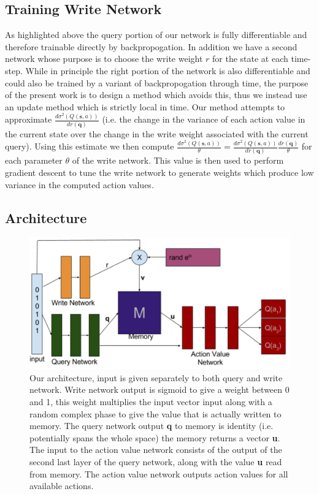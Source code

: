 \documentclass{article}
\begin{document}
\subsection*{Training Write Network}
As highlighted above the query portion of our network is fully differentiable and therefore trainable directly by backpropogation. In addition we have a second network whose purpose is to choose the write weight $r$ for the state at each time-step. While in principle the right portion of the network is also differentiable and could also be trained by a variant of backpropogation through time, the purpose of the present work is to design a method which avoids this, thus we instead use an update method which is strictly local in time. Our method attempts to approximate $\frac{d\sigma^2(Q(\pmb{s},a))}{dr(\pmb{q})}$ (i.e. the change in the variance of each action value in the current state over the change in the write weight associated with the current query). Using this estimate we then compute $\frac{d\sigma^2(Q(\pmb{s},a))}{\theta}=\frac{d\sigma^2(Q(\pmb{s},a))}{dr(\pmb{q})}\frac{dr(\pmb{q})}{\theta}$ for each parameter $\theta$ of the write network. This value is then used to perform gradient descent to tune the write network to generate weights which produce low variance in the computed action values.
\subsection*{Architecture}
\begin{figure}[!ht]
\includegraphics[width=1\textwidth]{images/architecture.png}
\caption{Our architecture, input is given separately to both query and write network. Write network output is sigmoid to give a weight between 0 and 1, this weight multiplies the input vector input along with a random complex phase to give the value that is actually written to memory. The query network output \textbf{q} to memory is identity (i.e. potentially spans the whole space) the memory returns a vector \textbf{u}. The input to the action value network consists of the output of the second last layer of the query network, along with the value \textbf{u} read from memory. The action value network outputs action values for all available actions.  }
\label{fig:arch}
\end{figure}
\end{document}
